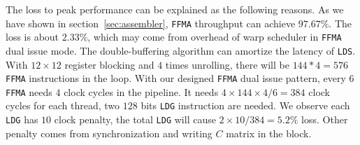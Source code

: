The loss to peak performance can be explained as the following reasons. As we have shown in 
section~\ref{sec:assembler}, {\tt FFMA} throughput can achieve $97.67\%$. 
The loss is about $2.33\%$, which may come 
from overhead of warp scheduler in {\tt FFMA} dual issue mode. The double-buffering algorithm can amortize the latency 
of {\tt LDS}.
With $12\times12$ register blocking and $4$ times unrolling, there will be $144*4=576$ {\tt FFMA} instructions in the loop.
With our designed {\tt FFMA} dual issue pattern, every $6$ {\tt FFMA} needs $4$ clock cycles in the pipeline.
It needs $4\times144\times4/6=384$ clock cycles for each thread,  two $128$ bits {\tt LDG} instruction are needed.
We observe each {\tt LDG} has $10$ clock penalty, the total {\tt LDG} will cause $2\times10/384 = 5.2\%$ loss. Other penalty 
comes from synchronization and writing $C$ matrix in the block.





